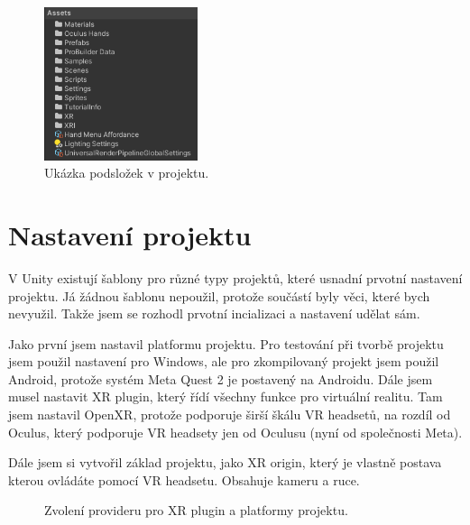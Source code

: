 \documentclass[12pt, a4paper,
twoside,        %
openright
]{report}
\begin{document}
		\begin{figure}[h!]
		\centering 
		\includegraphics[width=0.4\textwidth]{image/assets.png} 
		\caption{Ukázka podsložek v projektu.} 
		\label{fig:podslozky} 
	\end{figure}
	
	\newpage
	
\section{Nastavení projektu}
\label{sec:nastaveni_projektu}
V Unity existují šablony pro různé typy projektů, které usnadní prvotní nastavení projektu. Já žádnou šablonu nepoužil, protože součástí byly věci, které bych nevyužil. Takže jsem se rozhodl prvotní incializaci a nastavení udělat sám.

Jako první jsem nastavil platformu projektu. Pro testování při tvorbě projektu jsem použil nastavení pro Windows, ale pro zkompilovaný projekt jsem použil Android, protože systém Meta Quest 2 je postavený na Androidu. Dále jsem musel nastavit XR plugin, který řídí všechny funkce pro virtuální realitu. Tam jsem nastavil OpenXR, protože podporuje širší škálu VR headsetů, na rozdíl od Oculus, který podporuje VR headsety jen od Oculusu (nyní od společnosti Meta).

Dále jsem si vytvořil základ projektu, jako XR origin, který je vlastně postava kterou ovládáte pomocí VR headsetu. Obsahuje kameru a ruce.

\begin{figure}[h!]
	\centering
	\qquad
	\caption{Zvolení provideru pro XR plugin a platformy projektu.}
	\label{fig:nastaveni_unity}
\end{figure}
\end{document}
